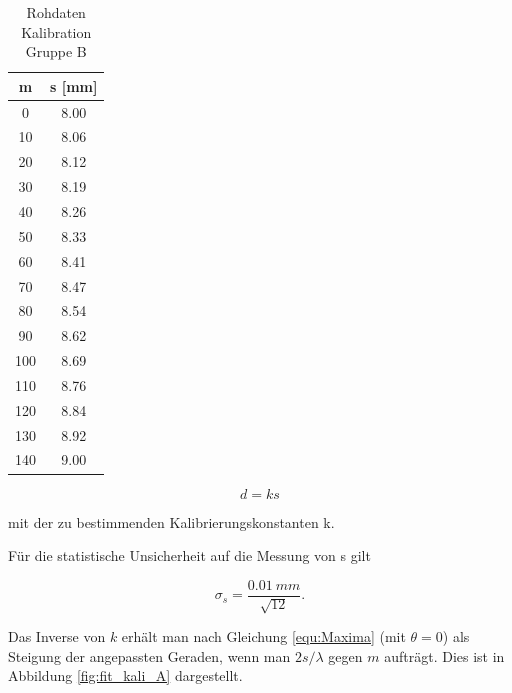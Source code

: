 \documentclass[12pt,a4paper]{article}
\begin{document}
\begin{table}
\begin{minipage}{0.5\textwidth}
	\end{minipage}
	\begin{minipage}{0.5\textwidth}
		\centering
		\begin{tabular}{|c|c|}
			\hline
			m & s [mm] \\
			\hline
			0 & 8.00 \\
			\hline
			10 & 8.06 \\
			\hline
			20 & 8.12 \\
			\hline
			30 & 8.19 \\
			\hline
			40 & 8.26 \\
			\hline
			50 & 8.33 \\
			\hline
			60 & 8.41 \\
			\hline
			70 & 8.47 \\
			\hline
			80 & 8.54 \\
			\hline
			90 & 8.62 \\
			\hline
			100 & 8.69 \\
			\hline
			110 & 8.76 \\
			\hline
			120 & 8.84 \\
			\hline
			130 & 8.92 \\
			\hline
			140 & 9.00 \\
			\hline
		\end{tabular}
		\caption{Rohdaten Kalibration Gruppe B}
		\label{tab:kali_B}
	\end{minipage}
\end{table}

\begin{equation}
d = ks
\end{equation}

mit der zu bestimmenden Kalibrierungskonstanten k.

Für die statistische Unsicherheit auf die Messung von s gilt

\begin{equation}
\sigma_s = \frac{\SI{0.01}{mm}}{\sqrt{12}}.
\end{equation}

Das Inverse von $k$ erhält man nach Gleichung \ref{equ:Maxima} (mit $\theta = 0$) als Steigung der angepassten Geraden, wenn man $2 s /\lambda$ gegen $m$ aufträgt. Dies ist in Abbildung \ref{fig:fit_kali_A} dargestellt.
\end{document}
